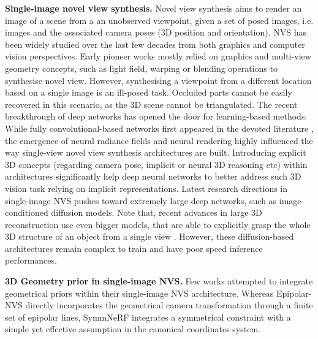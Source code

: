 \noindent\textbf{Single-image novel view synthesis.} Novel view synthesis aims to render an image of a scene from a an unobserved viewpoint, given a set of posed images, i.e. images and the associated camera poses (3D position and orientation). NVS has been widely studied over the last few decades from both graphics and computer vision perspectives. Early pioneer works \citep{chen93view,levoy96light,fitzgibbon2005image} mostly relied on graphics and multi-view geometry concepts, such as light field, warping or blending operations to synthesise novel view. However, synthesising a viewpoint from a different location based on a single image is an ill-posed task. Occluded parts cannot be easily recovered in this scenario, as the 3D scene cannot be triangulated. The recent breakthrough of deep networks has opened the door for learning-based methods. While fully convolutional-based networks first appeared in the devoted literature \citep{zhou2016view,sun2018multi,kim2020novel,hou2021novel,guo2022fast,landreau2022epipolarnvs}, the emergence of neural radiance fields \citep{mildenhall2020nerf} and neural rendering \citep{tewari2022advances} highly influenced the way single-view novel view synthesis architectures \citep{yu2021pixelnerf,li2022symmnerf,lin2023vision} are built. Introducing explicit 3D concepts (regarding camera pose, implicit or neural 3D reasoning etc) within architectures significantly help deep neural networks to better address such 3D vision task relying on implicit representations. Latest research directions in single-image NVS pushes toward extremely large deep networks, such as image-conditioned diffusion models\citep{chen2023single,xiong2023light,chan2023genvs,yu2023long}. Note that, recent advances in large 3D reconstruction \citep{hong2023lrm} use even bigger models, that are able to explicitly grasp the whole 3D structure of an object from a single view \citep{liu2023zero,shi2023zero123++,liu2024one,liu2023one2345++,zou2023triplane}. However, these diffusion-based architectures remain complex to train and have poor speed inference performances.  

\noindent\textbf{3D Geometry prior in single-image NVS.} Few works attempted to integrate geometrical priors within their single-image NVS architecture. Whereas Epipolar\--NVS \citep{landreau2022epipolarnvs} directly incorporates the geometrical camera transformation through a finite set of epipolar lines, SymmNeRF \citep{li2022symmnerf} integrates a symmetrical constraint with a simple yet effective assumption in the canonical coordinates system. 
\newline

